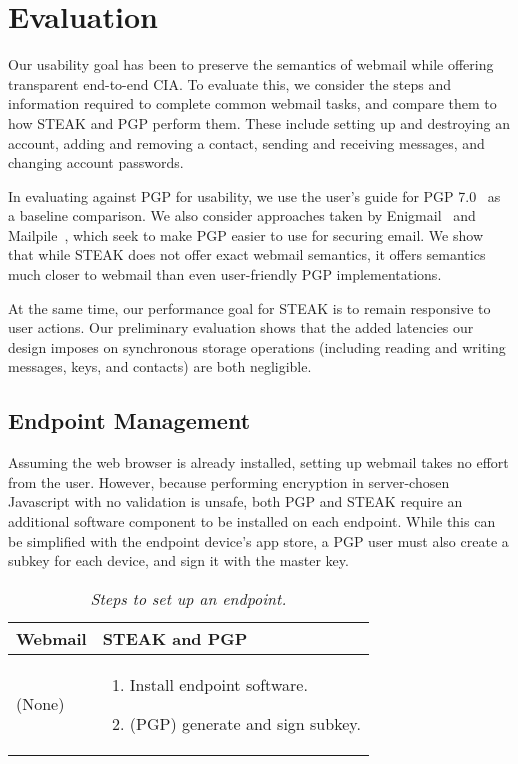 \section{Evaluation}
\label{sec:evaluation}

Our usability goal has been to preserve the semantics of webmail while offering transparent end-to-end CIA.  To evaluate this, we consider the steps and information required to complete common webmail tasks, and compare them to how STEAK and PGP perform them.  These include setting up and destroying an account, adding and removing a contact, sending and receiving messages, and changing account passwords.

In evaluating against PGP for usability, we use the user’s guide for PGP 7.0~\cite{pgp7} as a baseline comparison.  We also consider approaches taken by Enigmail~\cite{enigmail} and Mailpile~\cite{mailpile}, which seek to make PGP easier to use for securing email.  We show that while STEAK does not offer exact webmail semantics, it offers semantics much closer to webmail than even user-friendly PGP implementations.

At the same time, our performance goal for STEAK is to remain responsive to user actions.  Our preliminary evaluation shows that the added latencies our design imposes on synchronous storage operations (including reading and writing messages, keys, and contacts) are both negligible.

\subsection{Endpoint Management}
Assuming the web browser is already installed, setting up webmail takes no effort from the user.  However, because performing encryption in server-chosen Javascript with no validation is unsafe, both PGP and STEAK require an additional software component to be installed on each endpoint.  While this can be simplified with the endpoint device's app store, a PGP user must also create a subkey for each device, and sign it with the master key.

\begin{table}[ht!]
\begin{tabular}{ | L{2.0cm} | L{4.5cm} |}
\hline
\textbf{Webmail} & \textbf{STEAK and PGP} \\
\hline
(None) &

\vspace{-3mm} 
\begin{enumerate}
  \item{Install endpoint software.}
  \item{(PGP) generate and sign subkey.}
\end{enumerate} \\

\hline
\end{tabular}
\caption{\it Steps to set up an endpoint.}
\label{tab:account-creation}
\end{table}

